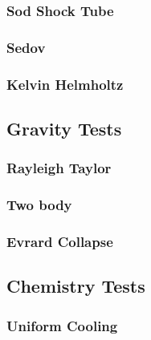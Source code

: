 \subsubsection{Sod Shock Tube}
\subsubsection{Sedov}
\subsubsection{Kelvin Helmholtz}

\subsection{Gravity Tests}
\subsubsection{Rayleigh Taylor}
\subsubsection{Two body}
\subsubsection{Evrard Collapse}

\subsection{Chemistry Tests}
\subsubsection{Uniform Cooling}
